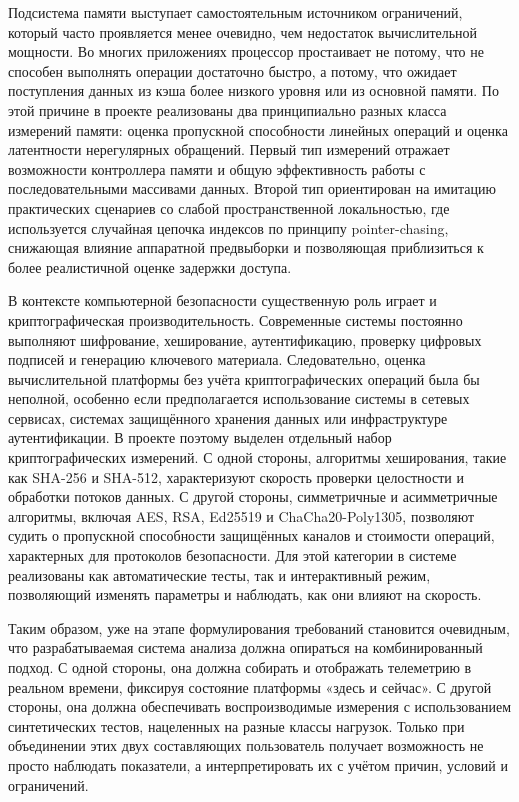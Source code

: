 Подсистема памяти выступает самостоятельным источником ограничений, который часто проявляется менее очевидно, чем недостаток вычислительной мощности. Во многих приложениях процессор простаивает не потому, что не способен выполнять операции достаточно быстро, а потому, что ожидает поступления данных из кэша более низкого уровня или из основной памяти. По этой причине в проекте реализованы два принципиально разных класса измерений памяти: оценка пропускной способности линейных операций и оценка латентности нерегулярных обращений. Первый тип измерений отражает возможности контроллера памяти и общую эффективность работы с последовательными массивами данных. Второй тип ориентирован на имитацию практических сценариев со слабой пространственной локальностью, где используется случайная цепочка индексов по принципу pointer-chasing, снижающая влияние аппаратной предвыборки и позволяющая приблизиться к более реалистичной оценке задержки доступа.

В контексте компьютерной безопасности существенную роль играет и криптографическая производительность. Современные системы постоянно выполняют шифрование, хеширование, аутентификацию, проверку цифровых подписей и генерацию ключевого материала. Следовательно, оценка вычислительной платформы без учёта криптографических операций была бы неполной, особенно если предполагается использование системы в сетевых сервисах, системах защищённого хранения данных или инфраструктуре аутентификации. В проекте поэтому выделен отдельный набор криптографических измерений. С одной стороны, алгоритмы хеширования, такие как SHA-256 и SHA-512, характеризуют скорость проверки целостности и обработки потоков данных. С другой стороны, симметричные и асимметричные алгоритмы, включая AES, RSA, Ed25519 и ChaCha20-Poly1305, позволяют судить о пропускной способности защищённых каналов и стоимости операций, характерных для протоколов безопасности. Для этой категории в системе реализованы как автоматические тесты, так и интерактивный режим, позволяющий изменять параметры и наблюдать, как они влияют на скорость.

Таким образом, уже на этапе формулирования требований становится очевидным, что разрабатываемая система анализа должна опираться на комбинированный подход. С одной стороны, она должна собирать и отображать телеметрию в реальном времени, фиксируя состояние платформы «здесь и сейчас». С другой стороны, она должна обеспечивать воспроизводимые измерения с использованием синтетических тестов, нацеленных на разные классы нагрузок. Только при объединении этих двух составляющих пользователь получает возможность не просто наблюдать показатели, а интерпретировать их с учётом причин, условий и ограничений.

